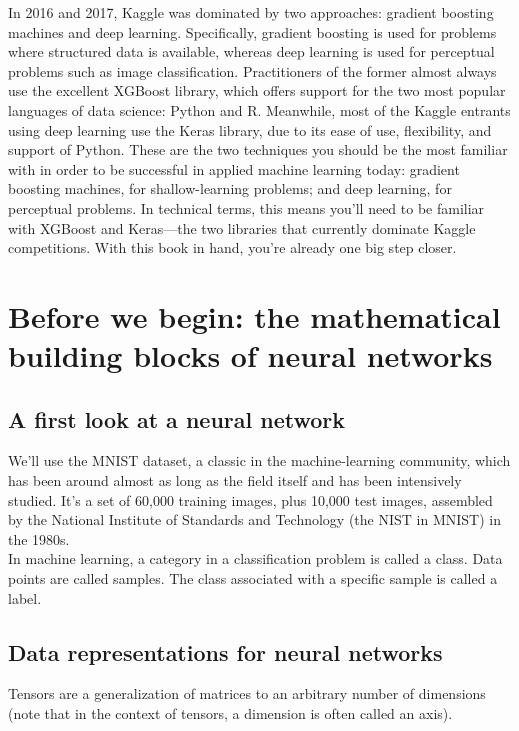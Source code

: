 \documentclass{article}
\numberwithin{equation}{section} %
\begin{document}
In 2016 and 2017, Kaggle was dominated by two approaches: gradient boosting
machines and deep learning. Specifically, gradient boosting is used for problems
where structured data is available, whereas deep learning is used for perceptual problems such as image classification. Practitioners of the former almost always use the excellent XGBoost library, which offers support for the two most popular languages of data science: Python and R. Meanwhile, most of the Kaggle entrants using deep learning use the Keras library, due to its ease of use, flexibility, and support of Python. These are the two techniques you should be the most familiar with in order to be successful in applied machine learning today: gradient boosting machines, for shallow-learning problems; and deep learning, for perceptual problems. In technical terms, this means you’ll need to be familiar with XGBoost and Keras—the two libraries that currently dominate Kaggle competitions. With this book in hand, you’re already one big step closer.


\newpage

\section{Before we begin: the mathematical building blocks of neural networks}

\subsection{A first look at a neural network}

We’ll use the MNIST dataset, a classic in the machine-learning community, which has been around almost as long as the field itself and has been intensively studied. It’s a set of 60,000 training images, plus 10,000 test images, assembled by the National Institute of Standards and Technology (the NIST in MNIST) in the 1980s. \\

In machine learning, a category in a classification problem is called a class. Data
points are called samples. The class associated with a specific sample is called a
label. \\

\subsection{Data representations for neural networks}

Tensors are a generalization of matrices to an arbitrary number of dimensions
(note that in the context of tensors, a dimension is often called an axis). \\
\end{document}
